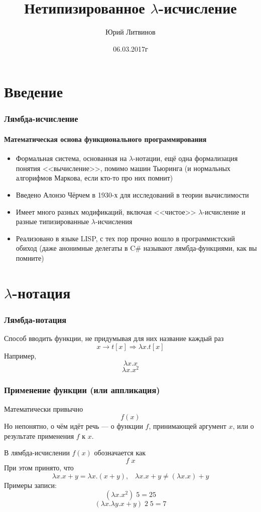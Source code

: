 \documentclass[xetex,mathserif,serif]{beamer}
\title{Нетипизированное $\lambda$-исчисление}
\author{Юрий Литвинов}
\date{06.03.2017г}
\begin{document}
	
	\frame{\titlepage}

	\section{Введение}
	
	\begin{frame}
		\frametitle{Лямбда-исчисление}
		\framesubtitle{Математическая основа функционального программирования}
		\begin{itemize}
			\item Формальная система, основанная на $\lambda$-нотации, ещё одна формализация
					понятия <<вычисление>>, помимо машин Тьюринга (и нормальных алгорифмов
					Маркова, если кто-то про них помнит)
			\item Введено Алонзо Чёрчем в 1930-х для исследований в теории вычислимости
			\item Имеет много разных модификаций, включая <<чистое>> $\lambda$-исчисление и
					разные типизированные $\lambda$-исчисления
			\item Реализовано в языке LISP, с тех пор прочно вошло в программистский обиход
					(даже анонимные делегаты в C\# называют лямбда-функциями, как вы помните)
		\end{itemize}
	\end{frame}
		
	\section{$\lambda$-нотация}
		
	\begin{frame}
		\frametitle{Лямбда-нотация}
		Способ вводить функции, не придумывая для них название каждый раз
		$$x \rightarrow t[x] \Longrightarrow \lambda x.t[x]$$
		Например,
		$$\lambda x.x$$
		$$\lambda x.x^2$$
	\end{frame}

	\begin{frame}
		\frametitle{Применение функции (или аппликация)}
		Математически привычно
		$$f(x)$$
		Но непонятно, о чём идёт речь --- о функции $f$, принимающей аргумент $x$, или о результате применения
		$f$ к $x$. 

		В лямбда-исчислении $f(x)$ обозначается как
		$$f \; x$$
		При этом принято, что
		$$\lambda x. x + y = \lambda x.(x + y), \;\;\; 
		\lambda x. x + y \neq (\lambda x.x) + y$$
		Примеры записи:
		$$(\lambda x.x^2) \; 5 = 25$$
		$$(\lambda x.\lambda y.x + y) \; 2 \; 5 = 7$$
	\end{frame}
\end{document}

